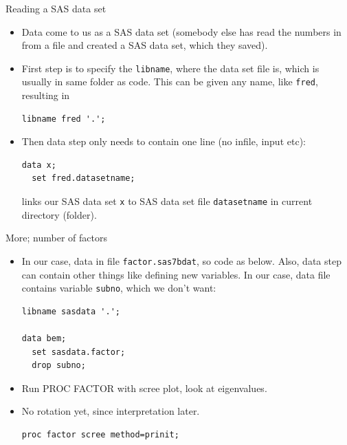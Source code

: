 \documentclass[pdf]{prosper}
\begin{document}
\begin{slide}{Reading a SAS data set}

  \begin{itemize}
  \item Data come to us as a SAS data set (somebody else has read the numbers in from a file and created a SAS data set, which they saved).
  \item First step is to specify the \verb-libname-, where the data set file is, which is usually in same folder as code. This can be given any name, like \verb-fred-, resulting in 

\begin{verbatim}
libname fred '.';
\end{verbatim}

  \item Then data step only needs to contain one line (no infile, input etc):

\begin{verbatim}
data x;
  set fred.datasetname;
\end{verbatim}

links our SAS data set \verb-x- to SAS data set file \verb-datasetname- in current directory (folder).
\end{itemize}
\end{slide}

\begin{slide}{More; number of factors}

\begin{itemize}
\item
In our case, data in file \verb-factor.sas7bdat-, so code as below. Also, data step can contain other things like defining new variables. In our case, data file contains variable \verb-subno-, which we don't want:

\begin{verbatim}
libname sasdata '.';

data bem;
  set sasdata.factor;
  drop subno;

\end{verbatim}

  \item Run PROC FACTOR with scree plot, look at eigenvalues.
  \item No rotation yet, since interpretation later. 

\begin{verbatim}
proc factor scree method=prinit;
\end{verbatim}
  \end{itemize}


\end{slide}
\end{document}
